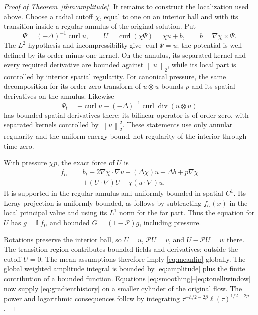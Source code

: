 \documentclass[11pt]{article}
\theoremstyle{remark}
\newcommand{\PP}{\mathcal P}
\newcommand{\norm}[1]{\left\lVert#1\right\rVert}
\newcommand{\curl}{\operatorname{curl}}
\newcommand{\diver}{\operatorname{div}}
\begin{document}
\begin{proof}[Proof of Theorem~\ref{thm:amplitude}]
It remains to construct the localization used above. Choose a radial
cutoff $\chi$, equal to one on an interior ball and with its transition
inside a regular annulus of the original solution. Put
\[
 \Psi=(-\Delta)^{-1}\curl u,\qquad
 U=\curl(\chi\Psi)=\chi u+b,\qquad b=\nabla\chi\times\Psi.
\]
The $L^2$ hypothesis and incompressibility give $\curl\Psi=u$;
the potential is well defined by its order-minus-one kernel.
On the annulus, its separated kernel and every required derivative
are bounded against $\norm u_2$, while its local part is controlled
by interior spatial regularity. For canonical pressure, the same
decomposition for its order-zero transform of $u\otimes u$ bounds
$p$ and its spatial derivatives on the annulus. Likewise
\[
 \Psi_t=-\curl u-(-\Delta)^{-1}\curl\diver(u\otimes u)
\]
has bounded spatial derivatives there: its bilinear operator is of
order zero, with separated kernels controlled by $\norm u_2^2$.
These statements use only annular regularity and the uniform energy
bound, not regularity of the interior through time zero.

With pressure $\chi p$, the exact force of $U$ is
\begin{equation}\label{eq:cutoffforce}
\begin{split}
 f_U={}&b_t-2\nabla\chi\cdot\nabla u-(\Delta\chi)u-\Delta b
                       +p\nabla\chi\\
      &+(U\cdot\nabla)U-\chi(u\cdot\nabla)u.
\end{split}
\end{equation}
It is supported in the regular annulus and uniformly bounded in
spatial $C^1$. Its Leray projection is uniformly bounded, as follows
by subtracting $f_U(x)$ in the local principal value and using its
$L^1$ norm for the far part. Thus the equation for $U$ has
$g=\mathbb L f_U$ and bounded $G=(1-\PP)g$, including pressure.

Rotations preserve the interior ball, so $U=u$, $\PP U=v$, and
$U-\PP U=w$ there. The transition region contributes bounded fields
and derivatives; outside the cutoff $U=0$. The mean assumptions
therefore imply \eqref{eq:meanlip} globally. The global weighted amplitude integral
is bounded by \eqref{eq:amplitude} plus the finite contribution of a
bounded function. Equations \eqref{eq:smoothing}--\eqref{eq:tonelliwindow}
now supply \eqref{eq:gradienthistory} on a smaller cylinder of the
original flow. The power and
logarithmic consequences follow by integrating
$\tau^{-h/2-2\beta}\ell(\tau)^{1/2-2p}$.
\end{proof}
\end{document}
